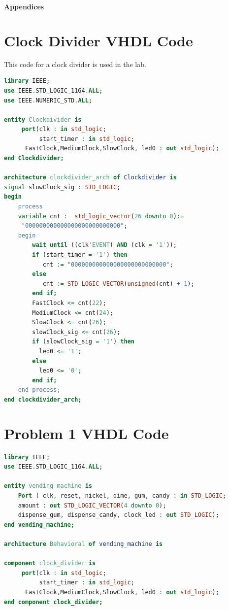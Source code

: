\documentclass[11pt]{article}
\begin{document}
\pagebreak

\textbf{Appendices}

\begin{appendices}

\section{Clock Divider VHDL Code}
This code for a clock divider is used in the lab.

\begin{lstlisting}[language=VHDL]
library IEEE;
use IEEE.STD_LOGIC_1164.ALL;
use IEEE.NUMERIC_STD.ALL;

entity Clockdivider is
     port(clk : in std_logic;
          start_timer : in std_logic;
	  FastClock,MediumClock,SlowClock, led0 : out std_logic);
end Clockdivider;

architecture clockdivider_arch of Clockdivider is
signal slowClock_sig : STD_LOGIC;
begin
    process  
    variable cnt :	std_logic_vector(26 downto 0):=
     "000000000000000000000000000";
    begin					 
        wait until ((clk'EVENT) AND (clk = '1'));
		if (start_timer = '1') then
	       cnt := "000000000000000000000000000";
	    else  
           cnt := STD_LOGIC_VECTOR(unsigned(cnt) + 1);
	    end if;
   	    FastClock <= cnt(22);
   	    MediumClock <= cnt(24);	
   	    SlowClock <= cnt(26);
        slowClock_sig <= cnt(26);
        if (slowClock_sig = '1') then
		  led0 <= '1';
	    else
		  led0 <= '0';
	    end if;
	end process;
end clockdivider_arch;
\end{lstlisting}

\section{Problem 1 VHDL Code}

\begin{lstlisting}[language=VHDL]
library IEEE;
use IEEE.STD_LOGIC_1164.ALL;

entity vending_machine is
    Port ( clk, reset, nickel, dime, gum, candy : in STD_LOGIC;
    amount : out STD_LOGIC_VECTOR(4 downto 0);
    dispense_gum, dispense_candy, clock_led : out STD_LOGIC);
end vending_machine;

architecture Behavioral of vending_machine is

component clock_divider is
     port(clk : in std_logic;
          start_timer : in std_logic;
	  FastClock,MediumClock,SlowClock, led0 : out std_logic);
end component clock_divider;


\end{lstlisting}
\end{appendices}
\end{document}
